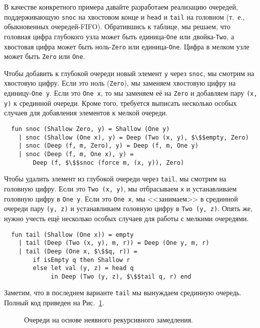 В качестве конкретного примера давайте разработаем реализацию
очередей, поддерживающую \lstinline!snoc! на хвостовом конце и
\lstinline!head! и \lstinline!tail! на головном (т.~е., обыкновенных
очередей-FIFO). Обратившись к таблице, мы решаем, что головная цифра
глубокого узла может быть единица-\lstinline!One! или
двойка-\lstinline!Two!, а хвостовая цифра может быть
ноль-\lstinline!Zero! или единица-\lstinline!One!. Цифра в мелком узле
может быть \lstinline!Zero! или \lstinline!One!.

Чтобы добавить к глубокой очереди новый элемент \lstinline!y! через
\lstinline!snoc!, мы смотрим на хвостовую цифру. Если это ноль
(\lstinline!Zero!), мы заменяем хвостовую цифру на 
единицу-\lstinline!One y!. Если это \lstinline!One x!, то мы заменяем её на \lstinline!Zero!
и добавляем пару \lstinline!(x, y)! к срединной очереди. Кроме того,
требуется выписать несколько особых случаев для добавления элементов к
мелкой очереди.
\begin{lstlisting}
  fun snoc (Shallow Zero, y) = Shallow (One y)
    | snoc (Shallow (One x), y) = Deep (Two (x, y), $\$$empty, Zero)
    | snoc (Deep (f, m, Zero), y) = Deep (f, m, One y)
    | snoc (Deep (f, m, One x), y) = 
        Deep (f, $\$$snoc (force m, (x, y)), Zero)
\end{lstlisting}

Чтобы удалить элемент из глубокой очереди через
\lstinline!tail!, мы смотрим на головную цифру. Если это
\lstinline!Two (x, y)!, мы отбрасываем \lstinline!x! и устанавливаем
головную цифру в \lstinline!One y!. Если это \lstinline!One x!, мы
<<занимаем>> в срединной очереди пару \lstinline!(y, z)! и
устанавливаем головную цифру в \lstinline!Two (y, z)!. Опять же, нужно
учесть ещё несколько особых случаев для работы с мелкими очередями.
\begin{lstlisting}
  fun tail (Shallow (One x)) = empty
    | tail (Deep (Two (x, y), m, r)) = Deep (One y, m, r)
    | tail (Deep (One x, $\$$q, r)) =
        if isEmpty q then Shallow r
        else let val (y, z) = head q
             in Deep (Two (y, z), $\$$tail q, r) end
\end{lstlisting}
Заметим, что в последнем варианте \lstinline!tail! мы вынуждаем
срединную очередь. Полный код приведен на Рис.~\ref{fig:11.1}.

\begin{figure}
  \centering
  
  \caption{Очереди на основе неявного рекурсивного замедления.}
  \label{fig:11.1}
\end{figure}

